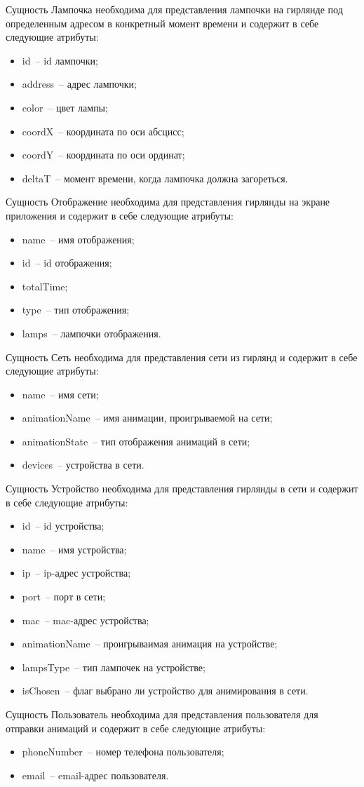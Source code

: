 Сущность Лампочка необходима для представления лампочки на гирлянде под определенным адресом в конкретный момент времени и содержит в себе следующие атрибуты:
\begin{itemize}
	\item id~-- id лампочки;
	\item address~-- адрес лампочки;
	\item color~-- цвет лампы;
	\item coordX~-- координата по оси абсцисс;
	\item coordY~-- координата по оси ординат;
	\item deltaT~-- момент времени, когда лампочка должна загореться.
\end{itemize}

Сущность Отображение необходима для представления гирлянды на экране приложения и содержит в себе следующие атрибуты:
\begin{itemize}
	\item name~-- имя отображения;
	\item id~-- id отображения;
	\item totalTime;
	\item type~-- тип отображения;
	\item lamps~-- лампочки отображения.
\end{itemize}

Сущность Сеть необходима для представления сети из гирлянд и содержит в себе следующие атрибуты:
\begin{itemize}
	\item name~-- имя сети;
	\item animationName~-- имя анимации, проигрываемой на сети;
	\item animationState~-- тип отображения анимаций в сети;
	\item devices~-- устройства в сети.
\end{itemize}

Сущность Устройство необходима для представления гирлянды в сети и содержит в себе следующие атрибуты:
\begin{itemize}
	\item id~-- id устройства;
	\item name~-- имя устройства;
	\item ip~-- ip-адрес устройства;
	\item port~-- порт в сети;
	\item mac~-- mac-адрес устройства;
	\item animationName~-- проигрываимая анимация на устройстве;
	\item lampsType~-- тип лампочек на устройстве;
	\item isChosen~-- флаг выбрано ли устройство для анимирования в сети.
\end{itemize}

Сущность Пользователь необходима для представления пользователя для отправки анимаций и содержит в себе следующие атрибуты:
\begin{itemize}
	\item phoneNumber~-- номер телефона пользователя;
	\item email~-- email-адрес пользователя.
\end{itemize}